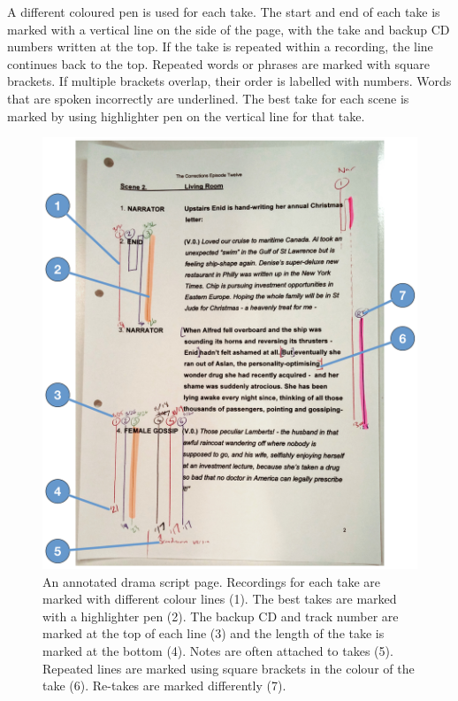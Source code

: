 A different coloured pen is used for each take. The start and end of each take is marked with a vertical line on the
side of the page, with the take and backup CD numbers written at the top. If the take is repeated within a recording,
the line continues back to the top. Repeated words or phrases are marked with square brackets. If multiple brackets
overlap, their order is labelled with numbers.  Words that are spoken incorrectly are underlined. The best take for
each scene is marked by using highlighter pen on the vertical line for that take.

\begin{figure}[p]
  \centering
  \includegraphics[width=\columnwidth]{figs/drama-markup-labelled.pdf}
  \caption{An annotated drama script page. Recordings for each take are marked with different colour lines (1). The best takes are marked with a highlighter pen (2). The backup CD and track number are marked at the top of each line (3) and the length of the take is marked at the bottom (4). Notes are often attached to takes (5). Repeated lines are marked using square brackets in the colour of the take (6). Re-takes are marked differently (7).}
  \label{fig:drama-script}
\end{figure}

